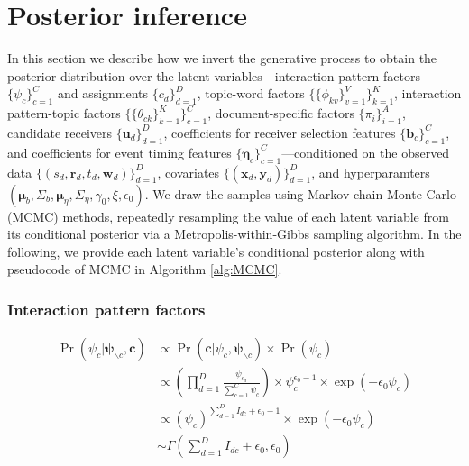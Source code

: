 \documentclass[ba]{imsart}
\numberwithin{equation}{section}
\theoremstyle{plain}
\begin{document}
	\section{Posterior inference}\label{sec:inference}
	In this section we describe how we invert the generative process to obtain the posterior distribution over the latent variables---interaction pattern factors $\{\psi_c\}_{c=1}^C$ and assignments $\{c_d\}_{d=1}^D$, topic-word factors $\{\{\phi_{kv}\}_{v=1}^V\}_{k=1}^K$, interaction pattern-topic factors $\{\{\theta_{ck}\}_{k=1}^K\}_{c=1}^C$, document-specific factors $\{\pi_{i}\}_{i=1}^A$, candidate receivers $\{\boldsymbol{u}_d\}_{d=1}^D$, coefficients for receiver selection features $\{\boldsymbol{b}_c\}_{c=1}^C$, and coefficients for event timing features $\{\boldsymbol{\eta}_c\}_{c=1}^C$---conditioned on the observed data $\{(s_d, \boldsymbol{r}_d, t_d, \boldsymbol{w}_d)\}_{d=1}^D$, covariates $\{(\boldsymbol{x}_d, \boldsymbol{y}_d)\}_{d=1}^D$, and hyperparamters $(\boldsymbol{\mu}_b, \Sigma_b, \boldsymbol{\mu}_\eta, \Sigma_\eta, \gamma_0, \xi, \epsilon_0)$. We draw the samples using Markov chain Monte Carlo (MCMC) methods, repeatedly resampling the value of each latent variable from its conditional posterior via a Metropolis-within-Gibbs sampling algorithm. In the following, we provide each latent variable's conditional posterior along with pseudocode of MCMC in Algorithm \ref{alg:MCMC}.
		\subsubsection{Interaction pattern factors}
		\begin{equation}
		\begin{aligned}
	\Pr(\psi_c|\boldsymbol{\psi}_{\backslash c}, \boldsymbol{c}) & \propto \Pr(\boldsymbol{c}|\psi_c, \boldsymbol{\psi}_{\backslash c}) \times \Pr(\psi_c)\\
	& \propto (\prod_{d=1}^D \frac{\psi_{c_d}}{\sum_{c=1}^C\psi_c} )\times \psi_c^{\epsilon_0-1} \times \exp(-\epsilon_0 \psi_c)\\
	&\propto (\psi_c)^{\sum_{d=1}^D I_{dc}+\epsilon_0-1}\times \exp(-\epsilon_0 \psi_c)\\
&	\sim \Gamma(\sum_{d=1}^D I_{dc}+\epsilon_0, \epsilon_0)
		\end{aligned}	
		\end{equation}
\end{document}
